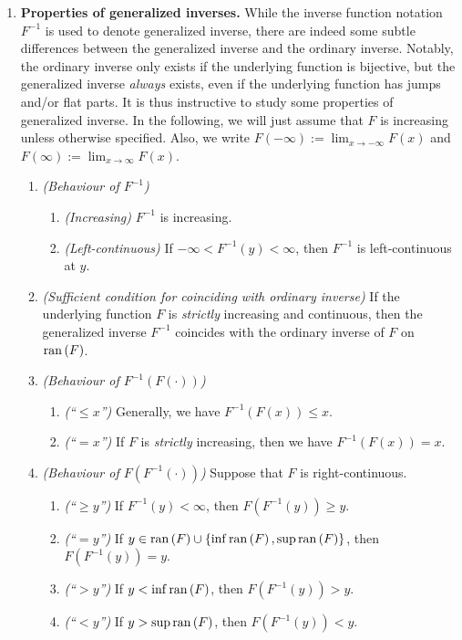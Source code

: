 \begin{enumerate}
\item \label{it:gen-inv-prop} \textbf{Properties of generalized inverses.}
While the inverse function notation \(F^{-1}\) is used to denote generalized
inverse, there are indeed some subtle differences between the generalized
inverse and the ordinary inverse. Notably, the ordinary inverse only exists if
the underlying function is bijective, but the generalized inverse \emph{always}
exists, even if the underlying function has jumps and/or flat parts. It is thus
instructive to study some properties of generalized inverse. In the following,
we will just assume that \(F\) is increasing unless otherwise specified. Also,
we write \(F(-\infty):=\lim_{x\to -\infty}F(x)\) and \(F(\infty):=\lim_{x\to
\infty}F(x)\).
\begin{enumerate}
\item \emph{(Behaviour of \(F^{-1}\))}
\begin{enumerate}
\item \emph{(Increasing)} \(F^{-1}\) is increasing.
\item \emph{(Left-continuous)} If \(-\infty<F^{-1}(y)<\infty\), then \(F^{-1}\)
is left-continuous at \(y\).
\end{enumerate}
\item \emph{(Sufficient condition for coinciding with ordinary inverse)} If the
underlying function \(F\) is \emph{strictly} increasing and continuous, then
the generalized inverse \(F^{-1}\) coincides with the ordinary inverse of
\(F\) on \(\operatorname{ran}\left(F\right)\).
\item \emph{(Behaviour of \(F^{-1}(F(\cdot))\))}
\begin{enumerate}
\item \emph{(``\(\le x\)'')} Generally, we have \(F^{-1}(F(x))\le x\).
\item \emph{(``\(=x\)'')} If \(F\) is \emph{strictly} increasing, then we have \(F^{-1}(F(x))=x\).
\end{enumerate}
\item \emph{(Behaviour of \(F(F^{-1}(\cdot))\))} Suppose that \(F\) is
right-continuous.
\begin{enumerate}
\item \emph{(``\(\ge y\)'')} If \(F^{-1}(y)<\infty\), then \(F(F^{-1}(y))\ge y\).
\item \emph{(``\(= y\)'')} If \(y\in\operatorname{ran}\left(F\right)\cup\{\inf\operatorname{ran}\left(F\right),\sup\operatorname{ran}\left(F\right)\}\), then \(F(F^{-1}(y))=y\).
\item \emph{(``\(> y\)'')} If \(y<\inf\operatorname{ran}\left(F\right)\), then \(F(F^{-1}(y))>y\).
\item \emph{(``\(< y\)'')} If \(y>\sup\operatorname{ran}\left(F\right)\), then \(F(F^{-1}(y))<y\).

\end{enumerate}
\end{enumerate}
\end{enumerate}
